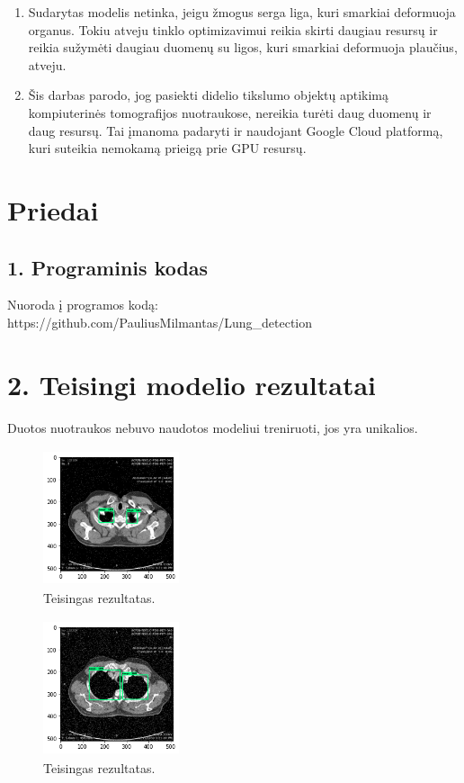 \documentclass{VUMIFInfKursinis}
\begin{document}
\begin{enumerate}
\item Sudarytas modelis netinka, jeigu žmogus serga liga, kuri smarkiai deformuoja organus. Tokiu atveju tinklo optimizavimui reikia skirti daugiau resursų ir reikia sužymėti daugiau duomenų su ligos, kuri smarkiai deformuoja plaučius, atveju.


\item Šis darbas parodo, jog pasiekti didelio tikslumo
objektų aptikimą kompiuterinės tomografijos nuotraukose, nereikia turėti daug duomenų ir daug
resursų. Tai įmanoma padaryti ir naudojant Google Cloud platformą, kuri suteikia
nemokamą prieigą prie GPU resursų.





\end{enumerate}

\printbibliography[heading=bibintoc]

\section*{Priedai}
\subsection*{1. Programinis kodas}
Nuoroda į programos kodą: https://github.com/PauliusMilmantas/Lung\_detection
\section*{2. Teisingi modelio rezultatai}
\par
Duotos nuotraukos nebuvo naudotos modeliui treniruoti, jos yra unikalios.
\begin{figure}[ht]
  \centering
  \includegraphics[width=4cm,height=4cm,keepaspectratio]{duom1.png}
  \caption{Teisingas rezultatas.}
  \label{fig:kaukė1}
\end{figure} 

\begin{figure}[ht]
  \centering
  \includegraphics[width=4cm,height=4cm,keepaspectratio]{duom2.png}
  \caption{Teisingas rezultatas.}
  \label{fig:kaukė1}
\end{figure} 
 
\end{document}
